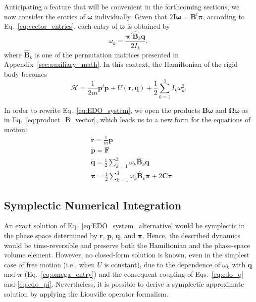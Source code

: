 \documentclass[aip,jcp,reprint,amsmath,amssymb,amsfont]{revtex4-1}
\newcommand{\mt}[1]{\boldsymbol{\mathbf{#1}}}           %
\newcommand{\vt}[1]{\boldsymbol{\mathbf{#1}}}           %
\newcommand{\tr}[1]{#1^t}                               %
\begin{document}
Anticipating a feature that will be convenient in the forthcoming sections, we now consider the entries of $\vt \omega$ individually. Given that $2{\mt I}{\vt \omega} = \tr{\mt B}{\vt \pi}$, according to Eq.~\ref{eq:vector_entries}, each entry of $\vt \omega$ is obtained by
\begin{equation}
\label{eq:omega_entry}
\omega_k = \frac{\tr{\vt \pi} \hat{\mt B}_k \vt q}{2 I_k},
\end{equation}
where $\hat{\mt B}_k$ is one of the permutation matrices presented in Appendix~\ref{sec:auxiliary_math}. In this context, the Hamiltonian of the rigid body becomes
\[
\mathcal{H} = \frac{1}{2m} \tr{\vt p} \vt p + U(\vt r, \vt q) + \frac{1}{2} \sum_{k=1}^3 I_k \omega_k^2.
\]

In order to rewrite Eq.~\ref{eq:EDO_system}, we open the products $\mt B \vt \omega$ and $\mt \Omega \vt \omega$ as in Eq.~\ref{eq:product_B_vector}, which leads us to a new form for the equations of motion:
\begin{subequations}
\label{eq:EDO_system_alternative}
\begin{align}
&\dot{\vt r} = \frac{1}{m} \vt p \\
&\dot{\vt p} = \vt F \\
&\dot{\vt q} = \frac{1}{2} \sum_{k=1}^3 \omega_k \hat{\mt B}_k \vt q \label{eq:edo_q} \\
&\dot{\vt \pi} = \frac{1}{2} \sum_{k=1}^3 \omega_k \hat{\mt B}_k \vt \pi + 2 \mt C \vt \tau \label{eq:edo_pi}
\end{align}
\end{subequations}

\subsection{Symplectic Numerical Integration}  
\label{symplectic}

An exact solution of Eq.~\ref{eq:EDO_system_alternative} would be symplectic in the phase space determined by $\vt r$, $\vt p$, $\vt q$, and $\vt \pi$. Hence, the described dynamics would be time-reversible and preserve both the Hamiltonian and the phase-space volume element. However, no closed-form solution is known, even in the simplest case of free motion (i.e., when $U$ is constant), due to the dependence of $\omega_k$ with $\vt q$ and $\vt \pi$ (Eq.~\ref{eq:omega_entry}) and the consequent coupling of Eqs.~\ref{eq:edo_q} and \ref{eq:edo_pi}. Nevertheless, it is possible to derive a symplectic approximate solution by applying the Liouville operator formalism.\cite{Tuckerman2010}
\end{document}
